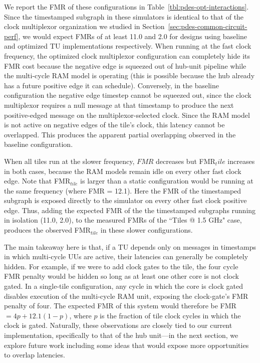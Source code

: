 We report the FMR of these configurations in
Table~\ref{tbl:pdes-opt-interactions}.  Since the timestamped subgraph in these
simulators is identical to that of the clock multiplexor organization we
studied in Section~\ref{sec:pdes-common-circuit-perf}, we would expect FMRs of
at least 11.0 and 2.0 for designs using baseline and optimized TU
implementations respectively. When running at the fast clock frequency, the
optimized clock multiplexor configuration can completely hide its FMR cost
because the negative edge is squeezed out of hub-unit pipeline while the
multi-cycle RAM model is operating (this is possible because the hub already has
a future positive edge it can schedule). Conversely, in the baseline
configuration the negative edge timestep cannot be squeezed out, since the
clock multiplexor requires a null message at that timestamp to produce the next
positive-edged message on the multiplexor-selected clock. Since the RAM model
is not active on negative edges of the tile's clock, this latency cannot be
overlapped. This produces the apparent partial overlapping observed in the
baseline configuration.

When all tiles run at the slower frequency, $FMR$ decreases but FMR$_tile$
increases in both cases, because the RAM models remain idle on every other fast
clock edge.  Note that FMR$_{tile}$ is larger than a static configuration would
be running at the same frequency (where FMR = 12.1). Here the FMR of the
timestamped subgraph is exposed directly to the simulator on every other fast
clock positive edge. Thus, adding the expected FMR of the the timestamped
subgraphs running in isolation (11.0, 2.0), to the measured FMRs of the ``Tiles
@ 1.5 GHz" case, produces the observed FMR$_{tile}$ in these slower
configurations.

The main takeaway here is that, if a TU depends only on messages in timestamps
in which multi-cycle UUs are active, their latencies can generally be
completely hidden. For example, if we were to add clock gates to the tile, the
four cycle FMR penalty would be hidden so long as at least one other core is
not clock gated. In a single-tile configuration, any cycle in which the core is
clock gated disables execution of the multi-cycle RAM unit, exposing the
clock-gate's FMR penalty of four. The expected FMR of this system would
therefore be FMR $= 4p + 12.1(1 - p)$, where $p$ is the fraction of tile clock
cycles in which the clock is gated. Naturally, these observations are closely
tied to our current implementation, specifically to that of the hub unit---in
the next section, we explore future work including some ideas that would expose
more opportunities to overlap latencies.

